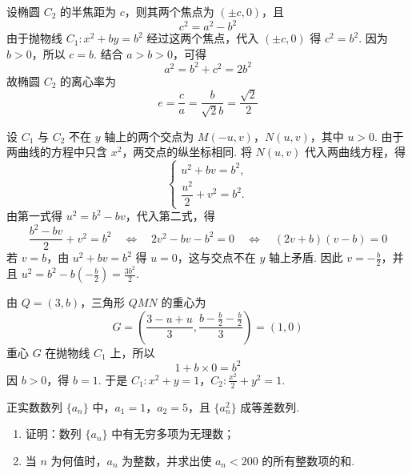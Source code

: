 \begin{solution}
设椭圆 \(C_{2}\) 的半焦距为 \(c\)，则其两个焦点为 \((\pm c,0)\)，且
\[
c^{2}=a^{2}-b^{2}
\]
由于抛物线 \(C_{1}:x^{2}+by=b^{2}\) 经过这两个焦点，代入 \((\pm c,0)\) 得 \(c^{2}=b^{2}\). 因为 \(b>0\)，所以 \(c=b\). 结合 \(a>b>0\)，可得
\[
a^{2}=b^{2}+c^{2}=2b^{2}
\]
故椭圆 \(C_{2}\) 的离心率为
\[
e=\frac{c}{a}=\frac{b}{\sqrt{2}b}=\frac{\sqrt{2}}{2}
\]

设 \(C_{1}\) 与 \(C_{2}\) 不在 \(y\) 轴上的两个交点为 \(M(-u,v)\)，\(N(u,v)\)，其中 \(u>0\). 由于两曲线的方程中只含 \(x^{2}\)，两交点的纵坐标相同. 将 \(N(u,v)\) 代入两曲线方程，得
\[
\begin{cases}
u^{2}+bv=b^{2},\\
\dfrac{u^{2}}{2}+v^{2}=b^{2}.
\end{cases}
\]
由第一式得 \(u^{2}=b^{2}-bv\)，代入第二式，得
\[
\frac{b^{2}-bv}{2}+v^{2}=b^{2}
\quad\Longleftrightarrow\quad
2v^{2}-bv-b^{2}=0
\quad\Longleftrightarrow\quad
(2v+b)(v-b)=0
\]
若 \(v=b\)，由 \(u^{2}+bv=b^{2}\) 得 \(u=0\)，这与交点不在 \(y\) 轴上矛盾. 因此 \(v=-\frac{b}{2}\)，并且 \(u^{2}=b^{2}-b\left(-\frac{b}{2}\right)=\frac{3b^{2}}{2}\).

由 \(Q=(3,b)\)，三角形 \(QMN\) 的重心为
\[
G=\left(\frac{3-u+u}{3},\frac{b-\frac{b}{2}-\frac{b}{2}}{3}\right)=(1,0)
\]
重心 \(G\) 在抛物线 \(C_{1}\) 上，所以
\[
1+b\times0=b^{2}
\]
因 \(b>0\)，得 \(b=1\). 于是
\(C_{1}:x^{2}+y=1\)，\(C_{2}:\frac{x^{2}}{2}+y^{2}=1\).
\end{solution}

\begin{problem}
正实数数列 \(\{a_{n}\}\) 中，\(a_{1} = 1\)，\(a_{2} = 5\)，且 \(\{a_{n}^{2}\}\) 成等差数列.
\begin{enumerate}
\item 证明：数列 \(\{a_{n}\}\) 中有无穷多项为无理数；
\item 当 \(n\) 为何值时，\(a_{n}\) 为整数，并求出使 \(a_{n} < 200\) 的所有整数项的和.
\end{enumerate}
\end{problem}

